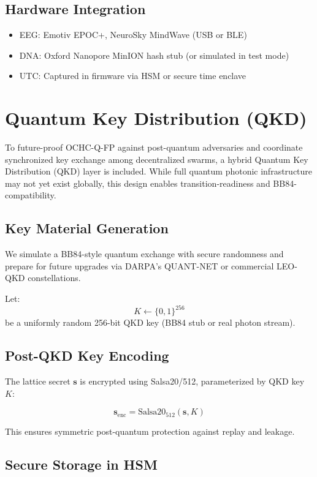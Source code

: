 \documentclass[12pt]{article}
\begin{document}
\subsection*{Hardware Integration}

\begin{itemize}
    \item EEG: Emotiv EPOC+, NeuroSky MindWave (USB or BLE)
    \item DNA: Oxford Nanopore MinION hash stub (or simulated in test mode)
    \item UTC: Captured in firmware via HSM or secure time enclave
\end{itemize}
\section*{Quantum Key Distribution (QKD)}

To future-proof OCHC-Q-FP against post-quantum adversaries and coordinate synchronized key exchange among decentralized swarms, a hybrid Quantum Key Distribution (QKD) layer is included. While full quantum photonic infrastructure may not yet exist globally, this design enables transition-readiness and BB84-compatibility.

\subsection*{Key Material Generation}

We simulate a BB84-style quantum exchange with secure randomness and prepare for future upgrades via DARPA's QUANT-NET or commercial LEO-QKD constellations.

Let:
\[
K \leftarrow \{0,1\}^{256}
\]
be a uniformly random 256-bit QKD key (BB84 stub or real photon stream).

\subsection*{Post-QKD Key Encoding}

The lattice secret \( \mathbf{s} \) is encrypted using Salsa20/512, parameterized by QKD key \( K \):

\[
\mathbf{s}_{\text{enc}} = \text{Salsa20}_{512}(\mathbf{s}, K)
\]

This ensures symmetric post-quantum protection against replay and leakage.

\subsection*{Secure Storage in HSM}
\end{document}

